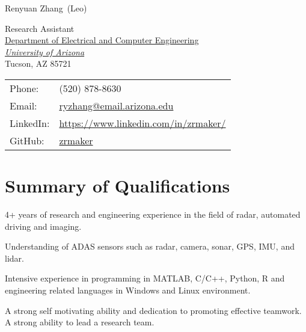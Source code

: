 \documentclass[letterpaper,9pt]{article}
\def\name{Renyuan Zhang}
\renewenvironment{itemize}{
  \begin{list}{}{
    \setlength{\topsep}{0pt}
    \setlength{\itemsep}{0pt}
    \setlength{\parsep}{0pt}
    \setlength{\partopsep}{0pt}
    \setlength{\leftmargin}{1.5em}
  }
}{\end{list}}
\begin{document}
{\huge \name \textnormal \ (Leo)}

\vspace{1em}

\begin{minipage}{0.55\linewidth}
  Research Assistant \\
  \href{http://ece.arizona.edu/}{Department of Electrical and Computer Engineering} \\
\href{http://www.arizona.edu/}{\it University of Arizona} \\
  Tucson, AZ 85721
\end{minipage}
\begin{minipage}{0.4\linewidth}
  \begin{tabular}{ll}
    Phone: & (520) 878-8630 \\
    Email: & \href{mailto:ryzhang@email.arizona.edu}{ryzhang@email.arizona.edu} \\
    LinkedIn: & \href{https://www.linkedin.com/in/zrmaker/}{https://www.linkedin.com/in/zrmaker/} \\
    GitHub: & \href{https://github.com/zrmaker}{zrmaker}
  \end{tabular}
\end{minipage}

%

\section*{Summary of Qualifications}
\begin{itemize}
  \setlength{\itemindent}{1em}
  \setlength{\itemsep}{.25em}
  \item 4+ years of research and engineering experience in the field of radar, automated driving and imaging.
  \item Understanding of ADAS sensors such as radar, camera, sonar, GPS, IMU, and lidar.
  \item Intensive experience in programming in MATLAB, C/C++, Python, R and engineering related languages in Windows and Linux environment.
  \item A strong self motivating ability and dedication to promoting effective teamwork. A strong ability to lead a research team.
\end{itemize}
\end{document}
